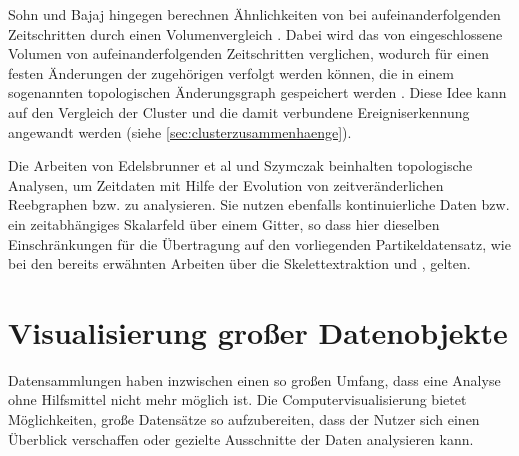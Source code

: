 Sohn und Bajaj hingegen berechnen Ähnlichkeiten von  bei aufeinanderfolgenden Zeitschritten durch einen Volumenvergleich \cite{silver1997trackingTurbulent3DFeatures}. Dabei wird das von  eingeschlossene Volumen von aufeinanderfolgenden Zeitschritten verglichen, wodurch für einen festen  Änderungen der zugehörigen  verfolgt werden können, die in einem sogenannten topologischen Änderungsgraph gespeichert werden \cite{sohn2006timeVaryingContourTopology}. Diese Idee kann auf den Vergleich der Cluster und die damit verbundene Ereigniserkennung angewandt werden (siehe \autoref{sec:clusterzusammenhaenge}).

Die Arbeiten von Edelsbrunner et al \cite{edelsbrunner2004timeVaryingReebGraphs} und Szymczak \cite{szymczak2005contourEvolutionInTimeDependentScalarFields} beinhalten topologische Analysen, um Zeitdaten mit Hilfe der Evolution von zeitveränderlichen Reebgraphen bzw.  zu analysieren. Sie nutzen ebenfalls kontinuierliche Daten bzw. ein zeitabhängiges Skalarfeld über einem Gitter, so dass hier dieselben Einschränkungen für die Übertragung auf den vorliegenden Partikeldatensatz, wie bei den bereits erwähnten Arbeiten über die Skelettextraktion und , gelten.

\section{Visualisierung großer Datenobjekte}\label{sec:related-vis}


Datensammlungen haben inzwischen einen so großen Umfang, dass eine Analyse ohne Hilfsmittel nicht mehr möglich ist. Die Computervisualisierung bietet Möglichkeiten, große Datensätze so aufzubereiten, dass der Nutzer sich einen Überblick verschaffen oder gezielte Ausschnitte der Daten analysieren kann.

